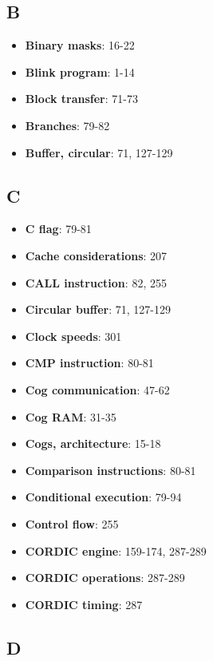 \documentclass[11pt]{book}
\providecommand{\tightlist}{%
  \setlength{\itemsep}{0pt}\setlength{\parskip}{0pt}}
\begin{document}
\hypertarget{b}{%
\subsection{B}\label{b}}

\begin{itemize}
\tightlist
\item
  \textbf{Binary masks}: 16-22
\item
  \textbf{Blink program}: 1-14
\item
  \textbf{Block transfer}: 71-73
\item
  \textbf{Branches}: 79-82
\item
  \textbf{Buffer, circular}: 71, 127-129
\end{itemize}

\hypertarget{c}{%
\subsection{C}\label{c}}

\begin{itemize}
\tightlist
\item
  \textbf{C flag}: 79-81
\item
  \textbf{Cache considerations}: 207
\item
  \textbf{CALL instruction}: 82, 255
\item
  \textbf{Circular buffer}: 71, 127-129
\item
  \textbf{Clock speeds}: 301
\item
  \textbf{CMP instruction}: 80-81
\item
  \textbf{Cog communication}: 47-62
\item
  \textbf{Cog RAM}: 31-35
\item
  \textbf{Cogs, architecture}: 15-18
\item
  \textbf{Comparison instructions}: 80-81
\item
  \textbf{Conditional execution}: 79-94
\item
  \textbf{Control flow}: 255
\item
  \textbf{CORDIC engine}: 159-174, 287-289
\item
  \textbf{CORDIC operations}: 287-289
\item
  \textbf{CORDIC timing}: 287
\end{itemize}

\hypertarget{d}{%
\subsection{D}\label{d}}
\end{document}

